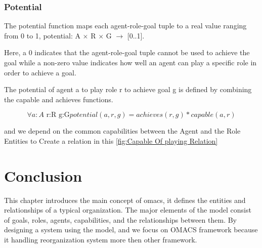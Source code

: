 \subsubsection{Potential}
The potential function maps each agent-role-goal tuple to a real value ranging from 0 to 1, 
potential: A $\times$ R $\times$ G $\rightarrow$ [0..1]\cite{omacs4}.

Here, a 0 indicates that the agent-role-goal tuple cannot be
used to achieve the goal while a non-zero value indicates how well an agent can play
a specific role in order to achieve a goal. 

The potential of agent a to play role r 
to achieve goal g is defined by combining the capable and achieves functions\cite{omacs4}.

\begin{equation}
\forall a:A\textrm{ r:R g:G}potential(a,r,g)=achieves(r,g)*capable(a,r)\label{eq:potentialFunc}
\end{equation}

and we depend on the common capabilities between the Agent and the Role Entities to Create a relation in this \ref{fig:Capable Of playing Relation} 


\section{Conclusion}
This chapter introduces the main concept of omacs, it defines the entities and relationships of a typical organization. 
The major elements of the model consist of goals, roles, agents, capabilities, and the relationships between them. By designing a system using the model, and we focus on OMACS framework because it handling reorganization system more then other framework.